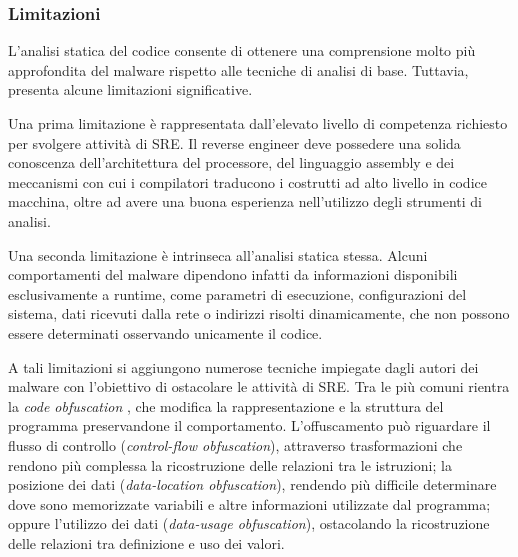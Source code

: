 \subsubsection{Limitazioni}

L'analisi statica del codice consente di ottenere una comprensione molto più approfondita del malware rispetto alle tecniche di analisi di base. Tuttavia, presenta alcune limitazioni significative.

Una prima limitazione è rappresentata dall'elevato livello di competenza richiesto per svolgere attività di SRE. Il reverse engineer deve possedere una solida conoscenza dell'architettura del processore, del linguaggio assembly e dei meccanismi con cui i compilatori traducono i costrutti ad alto livello in codice macchina, oltre ad avere una buona esperienza nell'utilizzo degli strumenti di analisi. %

Una seconda limitazione è intrinseca all'analisi statica stessa. Alcuni comportamenti del malware dipendono infatti da informazioni disponibili esclusivamente a runtime, come parametri di esecuzione, configurazioni del sistema, dati ricevuti dalla rete o indirizzi risolti dinamicamente, che non possono essere determinati osservando unicamente il codice.

A tali limitazioni si aggiungono numerose tecniche impiegate dagli autori dei malware con l'obiettivo di ostacolare le attività di SRE. Tra le più comuni rientra la \emph{code obfuscation} \cite{moser2007static}, che modifica la rappresentazione e la struttura del programma preservandone il comportamento. L'offuscamento può riguardare il flusso di controllo (\emph{control-flow obfuscation}), attraverso trasformazioni che rendono più complessa la ricostruzione delle relazioni tra le istruzioni; la posizione dei dati (\emph{data-location obfuscation}), rendendo più difficile determinare dove sono memorizzate variabili e altre informazioni utilizzate dal programma; oppure l'utilizzo dei dati (\emph{data-usage obfuscation}), ostacolando la ricostruzione delle relazioni tra definizione e uso dei valori. %


